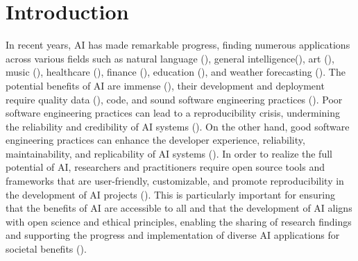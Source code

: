 
\section{Introduction}


 In recent years, AI has made remarkable progress, finding numerous applications across various fields such as natural language (\cite{gpt}), general intelligence(\cite{gato}), art (\cite{diffusion}), music (\cite{musiclm}), healthcare (\cite{aihealthcare}), finance (\cite{bao2022fraudartificial}), education (\cite{aieducation}), and weather forecasting (\cite{weather}). The potential benefits of AI are immense (\cite{beneficialai,potencialaibenefit}), their development and deployment require quality data (\cite{lecun2015deep}), code, and sound software engineering practices (\cite{se4dl,amershi2019software}). Poor software engineering practices can lead to a reproducibility crisis, undermining the reliability and credibility of AI systems (\cite{leakage-recrisis}). On the other hand, good software engineering practices can enhance the developer experience, reliability, maintainability, and replicability of AI systems (\cite{se4dl,amershi2019software, wan2019does}). In order to realize the full potential of AI, researchers and practitioners require open source tools and frameworks that are user-friendly, customizable, and promote reproducibility in the development of AI projects (\cite{lu2022softwareAIReponse,li2018can,wolf2020designing,olson2018system,ong2021guide,gundersen2018reproducible}). This is particularly important for ensuring that the benefits of AI are accessible to all and that the development of AI aligns with open science and ethical principles, enabling the sharing of research findings and supporting the progress and implementation of diverse AI applications for societal benefits (\cite{coro2020open,braun2018open, mittelstadt2016ethics,floridi2018ai4people,ong2021guide}).


